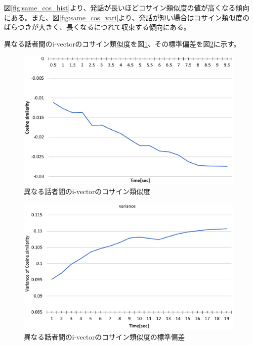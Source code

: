 図\ref{fig:same_cos_hist}より、発話が長いほどコサイン類似度の値が高くなる傾向にある。また、図\ref{fig:same_cos_vari}より、発話が短い場合はコサイン類似度のばらつきが大きく、長くなるにつれて収束する傾向にある。\par


\vspace{0.2in}\par
異なる話者間のi-vectorのコサイン類似度を図\ref{fig:other_cos_hist}、その標準偏差を図\ref{fig:other_cos_vari}に示す。\par

\begin{figure}[H]
  \begin{center}
    \includegraphics[scale=0.8]{./figure/other_cos_hist.eps}
  \end{center}
  \caption{異なる話者間のi-vectorのコサイン類似度 \label{fig:other_cos_hist}}
\end{figure}

\begin{figure}[H]
  \begin{center}
    \includegraphics[scale=0.8]{./figure/other_cos_vari.eps}
  \end{center}
  \caption{異なる話者間のi-vectorのコサイン類似度の標準偏差 \label{fig:other_cos_vari}}
\end{figure}

